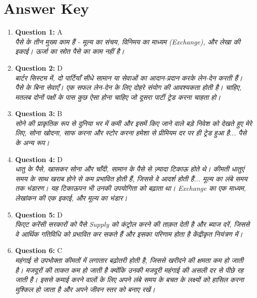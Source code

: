 \documentclass[12pt,a4paper]{article}
\begin{document}
\bigskip


\newpage
\section*{Answer Key}

\begin{enumerate}
\item \textbf{Question 1:} A
\\ \textit{पैसे के तीन मुख्य काम हैं - मूल्य का संचय, विनिमय का माध्यम (Exchange),
और लेखा की इकाई। ऊर्जा का स्रोत पैसे का काम नहीं है।}

\item \textbf{Question 2:} D
\\ \textit{बार्टर सिस्टम में, दो पार्टियाँ सीधे सामान या सेवाओं का आदान-प्रदान करके लेन-देन करती हैं।
पैसे के बिना सेवाएँ। एक सफल लेन-देन के लिए दोहरे संयोग की आवश्यकता होती है।
चाहिए, मतलब दोनों पक्षों के पास कुछ ऐसा होना चाहिए जो दूसरा पार्टी ट्रेड करना चाहता हो।}

\item \textbf{Question 3:} B
\\ \textit{सोने की प्राकृतिक रूप से दुनिया भर में कमी और इसमें किए जाने वाले बड़े निवेश को देखते हुए
मेरे लिए, सोना खोदना, साफ करना और स्टोर करना हमेशा से प्रीमियम दर पर ही ट्रेड हुआ है...
पैसे के अन्य रूप।}

\item \textbf{Question 4:} D
\\ \textit{धातु के पैसे, खासकर सोना और चाँदी, सामान के पैसे से ज़्यादा टिकाऊ होते थे।
कीमती धातुएं समय के साथ खराब होने से कम प्रभावित होती हैं, जिससे वे आदर्श होती हैं...
मूल्य का लंबे समय तक भंडारण। यह टिकाऊपन भी उनकी उपयोगिता को बढ़ाता था।
Exchange का एक माध्यम, लेखांकन की एक इकाई, और मूल्य का भंडार।}

\item \textbf{Question 5:} D
\\ \textit{फिएट करेंसी सरकारों को पैसे Supply को कंट्रोल करने की ताक़त देती है और
ब्याज दरें, जिससे वे आर्थिक गतिविधि को प्रभावित कर सकते हैं और इसका परिणाम होता है
केंद्रीकृत नियंत्रण में।}

\item \textbf{Question 6:} C
\\ \textit{महंगाई से उपभोक्ता कीमतों में लगातार बढ़ोतरी होती है, जिससे खरीदने की क्षमता कम हो जाती है।
मजदूरों की ताकत कम हो जाती है क्योंकि उनकी मजदूरी महंगाई की असली दर से पीछे रह जाती है।
इससे कमाई करने वालों के लिए अपने लंबे समय के बचत के लक्ष्यों को हासिल करना मुश्किल हो जाता है
और अपने जीवन स्तर को बनाए रखें।}


\end{enumerate}
\end{document}
